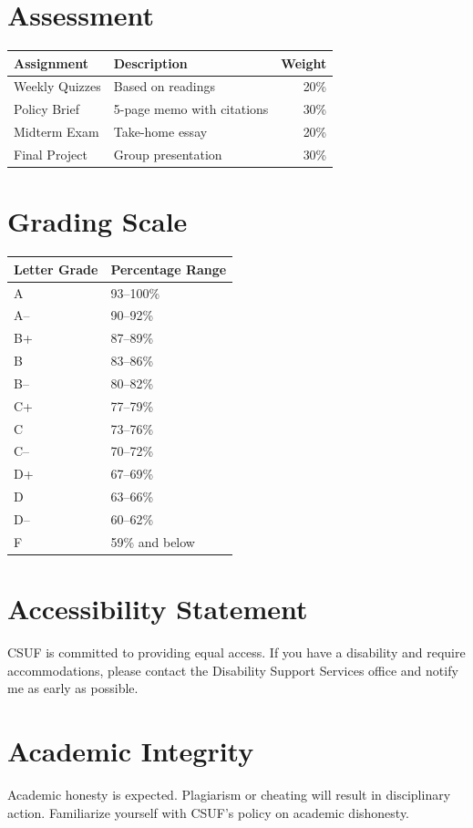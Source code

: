 \documentclass[11pt]{article}
\begin{document}
\section*{Assessment}
\begin{tabular}{@{}llr@{}}
\toprule
Assignment & Description & Weight \\
\midrule
Weekly Quizzes & Based on readings & 20\% \\
Policy Brief & 5-page memo with citations & 30\% \\
Midterm Exam & Take-home essay & 20\% \\
Final Project & Group presentation & 30\% \\
\bottomrule
\end{tabular}

\section*{Grading Scale}
\begin{tabular}{@{}ll@{}}
\toprule
Letter Grade & Percentage Range \\
\midrule
A & 93--100\% \\
A-- & 90--92\% \\
B+ & 87--89\% \\
B & 83--86\% \\
B-- & 80--82\% \\
C+ & 77--79\% \\
C & 73--76\% \\
C-- & 70--72\% \\
D+ & 67--69\% \\
D & 63--66\% \\
D-- & 60--62\% \\
F & 59\% and below \\
\bottomrule
\end{tabular}

\section*{Accessibility Statement}
CSUF is committed to providing equal access. If you have a disability and require accommodations, please contact the Disability Support Services office and notify me as early as possible.

\section*{Academic Integrity}
Academic honesty is expected. Plagiarism or cheating will result in disciplinary action. Familiarize yourself with CSUF’s policy on academic dishonesty.
\end{document}
